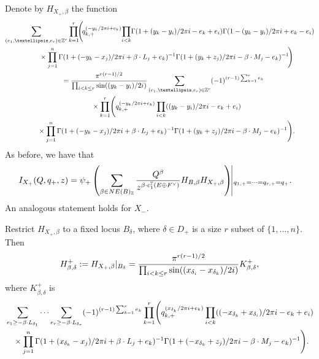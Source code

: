 \documentclass[11pt]{article}
\numberwithin{equation}{section}
\numberwithin{equation}{section}
\newcommand{\ZZ}{\mathbb{Z}}
\newcommand{\torus}{\mathbb{T}}
\newcommand{\F}{F}
\newcommand{\E}{E}
\newcommand{\MB}{M}
\newcommand{\LB}{L}
\newcommand{\z}{z}
\newcommand{\x}{x}
\newcommand{\y}{y}
\begin{document}
Denote by $H_{X_+, \beta}$ the function
\begin{gather*}
 \sum_{(e_1, \dots, e_r) \in \ZZ^r} \prod_{k=1}^r\! \Biggl(\!q_{k, +}^{(-\y_k/2\pi {\rm i} + e_k)}
\!\prod_{i < k}\! \Gamma(1 + (\y_k - \y_i)/2 \pi {\rm i} - e_k + e_i) \Gamma(1 - (\y_k - \y_i)/2 \pi {\rm i} + e_k - e_i)\! \\
\quad\quad{}\times \prod_{j=1}^n\Gamma(1+(-\y_k-\x_j)/2 \pi {\rm i}+\beta\cdot \LB_j+e_k)^{-1}\Gamma(1+(\y_k+\z_j)/2 \pi {\rm i}-\beta\cdot \MB_j-e_k)^{-1}\!\Biggr)
\\
\quad{} = \frac{\pi^{r(r-1)/2}}{\prod_{i<k\leq r} \sin((\y_k - \y_i)/2{\rm i})} \sum_{(e_1, \dots, e_r) \in \ZZ^r} (-1)^{(r-1) \sum_{k=1}^r e_k}
 \\
\qquad{} \times \prod_{k=1}^r \Biggl(q_{k, +}^{(-\y_k/2\pi {\rm i} + e_k)}
\prod_{i < k} ((\y_k - \y_i)/2 \pi {\rm i} - e_k + e_i)
 \\
\qquad{}\times \prod_{j=1}^n\Gamma(1+(-\y_k-\x_j)/2 \pi {\rm i}+\beta\cdot \LB_j+e_k)^{-1}\Gamma(1+(\y_k+\z_j)/2 \pi {\rm i}-\beta\cdot \MB_j-e_k)^{-1}\Biggr).
\end{gather*}
As before, we have that
\begin{align}\label{ItoH3} I_{X_+}(Q, q_+, z) &{}= \psi_+ \left( \sum_{\beta \in NE(B)_\ZZ} \frac{Q^\beta}{z^{\beta \cdot c_1^\torus(\E \oplus \F^\vee)}} H_{B, \beta} H_{X_+, \beta} \right)\vline_{q_{1, +} = \cdots =q_{r, +} = q_+}.
\end{align}
An analogous statement holds for $X_-$.

Restrict $H_{X_+, \beta}$ to a fixed locus $B_\delta$, where $\delta \in D_+$ is a size $r$ subset of $\{1, \dots, n\}$. Then
\begin{equation}\label{HBP}
 H^{+}_{\beta, \delta} := H_{X_+, \beta}|_{B_\delta} =
\frac{\pi^{r(r-1)/2}}{\prod_{i<k\leq r} \sin((\x_{\delta_i} - \x_{\delta_k})/2{\rm i})} K^{+}_{\beta, \delta},
\end{equation}
where $K^{+}_{\beta, \delta}$ is
\begin{align*}
&\sum_{e_1 \geq - \beta \cdot \LB_{\delta_1}} \cdots \sum _{e_r \geq - \beta \cdot \LB_{\delta_r}} (-1)^{(r-1) \sum_{k=1}^r e_k}\prod_{k=1}^r \Biggl(q_{k, +}^{( \x_{\delta_k}/2\pi {\rm i} + e_k)}
\prod_{i < k} ((- \x_{\delta_k} + \x_{\delta_i})/2 \pi {\rm i} - e_k + e_i)
 \\
& \quad{}\times \prod_{j=1}^n\Gamma (1+ (\x_{\delta_k}-\x_j )/2 \pi {\rm i}+\beta\cdot \LB_j+e_k )^{-1}\Gamma (1+ (-\x_{\delta_k}+\z_j )/2 \pi {\rm i}-\beta\cdot \MB_j-e_k )^{-1}\Biggr).
\end{align*}
\end{document}
